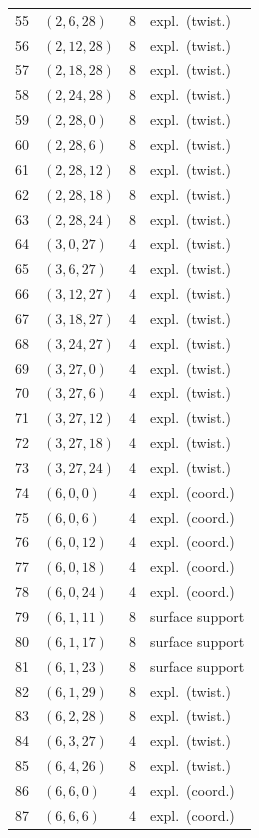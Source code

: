 \documentclass[11pt]{amsart}
\theoremstyle{remark}\newtheorem{remark}[theorem]{Remark}
\begin{document}
{\begin{longtable}{rlrl}
55 & $(2,6,28)$ & 8 & expl.\ (twist.)\\
56 & $(2,12,28)$ & 8 & expl.\ (twist.)\\
57 & $(2,18,28)$ & 8 & expl.\ (twist.)\\
58 & $(2,24,28)$ & 8 & expl.\ (twist.)\\
59 & $(2,28,0)$ & 8 & expl.\ (twist.)\\
60 & $(2,28,6)$ & 8 & expl.\ (twist.)\\
61 & $(2,28,12)$ & 8 & expl.\ (twist.)\\
62 & $(2,28,18)$ & 8 & expl.\ (twist.)\\
63 & $(2,28,24)$ & 8 & expl.\ (twist.)\\
64 & $(3,0,27)$ & 4 & expl.\ (twist.)\\
65 & $(3,6,27)$ & 4 & expl.\ (twist.)\\
66 & $(3,12,27)$ & 4 & expl.\ (twist.)\\
67 & $(3,18,27)$ & 4 & expl.\ (twist.)\\
68 & $(3,24,27)$ & 4 & expl.\ (twist.)\\
69 & $(3,27,0)$ & 4 & expl.\ (twist.)\\
70 & $(3,27,6)$ & 4 & expl.\ (twist.)\\
71 & $(3,27,12)$ & 4 & expl.\ (twist.)\\
72 & $(3,27,18)$ & 4 & expl.\ (twist.)\\
73 & $(3,27,24)$ & 4 & expl.\ (twist.)\\
74 & $(6,0,0)$ & 4 & expl.\ (coord.)\\
75 & $(6,0,6)$ & 4 & expl.\ (coord.)\\
76 & $(6,0,12)$ & 4 & expl.\ (coord.)\\
77 & $(6,0,18)$ & 4 & expl.\ (coord.)\\
78 & $(6,0,24)$ & 4 & expl.\ (coord.)\\
79 & $(6,1,11)$ & 8 & surface support\\
80 & $(6,1,17)$ & 8 & surface support\\
81 & $(6,1,23)$ & 8 & surface support\\
82 & $(6,1,29)$ & 8 & expl.\ (twist.)\\
83 & $(6,2,28)$ & 8 & expl.\ (twist.)\\
84 & $(6,3,27)$ & 4 & expl.\ (twist.)\\
85 & $(6,4,26)$ & 8 & expl.\ (twist.)\\
86 & $(6,6,0)$ & 4 & expl.\ (coord.)\\
87 & $(6,6,6)$ & 4 & expl.\ (coord.)\\

\end{longtable}}
\end{document}
